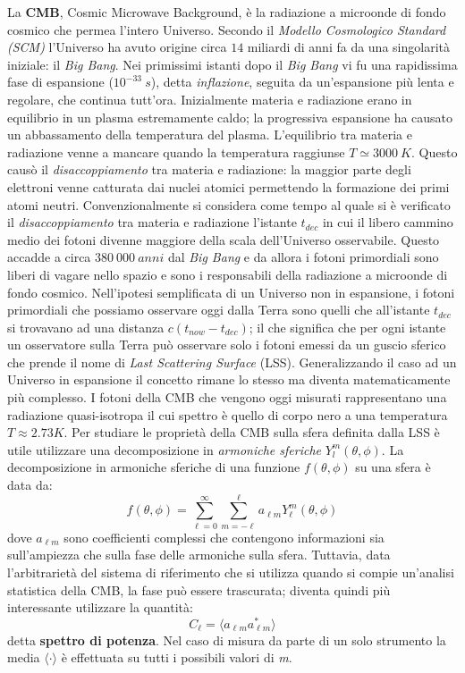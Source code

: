 \documentclass[12pt,a4paper,final]{book}
\begin{document}
La \textbf{CMB}, Cosmic Microwave Background, è la radiazione a microonde di fondo cosmico che permea l’intero Universo.
Secondo il \textit{Modello Cosmologico Standard (SCM)} l'Universo ha avuto origine circa $14$ miliardi di anni fa da una singolarità iniziale: il \textit{Big Bang}.
Nei primissimi istanti dopo il \textit{Big Bang} vi fu una rapidissima fase di espansione ($10^{-33}~\unit{s}$), detta \textit{inflazione}, seguita da un'espansione più lenta e regolare, che continua tutt'ora. Inizialmente materia e radiazione erano in equilibrio in un plasma estremamente caldo; la progressiva espansione ha causato un abbassamento della temperatura del plasma. L'equilibrio tra materia e radiazione venne a mancare quando la temperatura raggiunse $T \simeq 3000~\unit{K}$. Questo causò il \textit{disaccoppiamento} tra materia e radiazione: la maggior parte degli elettroni venne catturata dai nuclei atomici permettendo la formazione dei primi atomi neutri. Convenzionalmente si considera come tempo al quale si è verificato il \textit{disaccoppiamento} tra materia e radiazione l'istante $t_{dec}$ in cui il libero cammino medio dei fotoni divenne maggiore della scala dell'Universo osservabile. Questo accadde a circa $380~000~\unit{anni}$ dal \textit{Big Bang} e da allora i fotoni primordiali sono liberi di vagare nello spazio e sono i responsabili della radiazione a microonde di fondo cosmico.
Nell'ipotesi semplificata di un Universo non in espansione, i fotoni primordiali che possiamo osservare oggi dalla Terra sono quelli che all'istante $t_{dec}$ si trovavano ad una distanza $c(t_{now}-t_{dec})$; il che significa che per ogni istante un osservatore sulla Terra può osservare solo i fotoni emessi da un guscio sferico che prende il nome di \textit{Last Scattering Surface} (LSS). Generalizzando il caso ad un Universo in espansione il concetto rimane lo stesso ma diventa matematicamente più complesso. I fotoni della CMB che vengono oggi misurati rappresentano una radiazione quasi-isotropa il cui spettro è quello di corpo nero a una temperatura $T\approx2.73\unit{K}$. Per studiare le proprietà della CMB sulla sfera definita dalla LSS è utile utilizzare una decomposizione in \textit{armoniche sferiche} $Y_l^m(\theta,\phi)$. La decomposizione in armoniche sferiche di una funzione $f(\theta,\phi)$ su una sfera è data da:
\[f(\theta,\phi)=\sum_{\ell=0}^\infty\sum_{m=-\ell}^\ell a_{\ell m}Y_\ell^m(\theta,\phi)\]
dove $a_{\ell m}$ sono coefficienti complessi che contengono informazioni sia sull'ampiezza che sulla fase delle armoniche sulla sfera. Tuttavia, data l'arbitrarietà del sistema di riferimento che si utilizza quando si compie un'analisi statistica della CMB, la fase può essere trascurata; diventa quindi più interessante utilizzare la quantità: \[C_{\ell}=\langle a_{\ell m} a_{\ell m}^* \rangle\]
detta \textbf{spettro di potenza}. Nel caso di misura da parte di un solo strumento la media $\langle \cdot \rangle$ è effettuata su tutti i possibili valori di \textit{m}.
\end{document}
